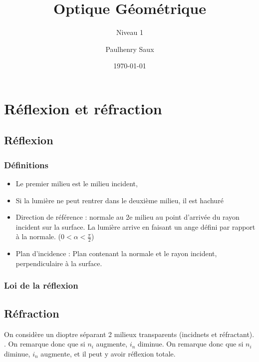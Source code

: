 \documentclass[french]{yLectureNote}
\title{Optique Géométrique}
\subtitle{Niveau 1}
\author{Paulhenry Saux}
\date{\today}
\begin{document}
\setcounter{chapter}{1}
	\chapter{Réflexion et réfraction}
	\section{Réflexion}
	\subsection{Définitions}
	\begin{itemize}
	 \item Le premier milieu est le milieu incident,
	 \item Si la lumière ne peut rentrer dans le deuxième milieu, il est hachuré
	 \item Direction de référence : normale au 2e milieu au point d'arrivée du rayon incident sur la surface. La lumière arrive en faisant un ange défini par rapport à la normale. ($0<\alpha<\frac{\pi}{2}$)
	 \item Plan d'incidence : Plan contenant la normale et le rayon incident, perpendiculaire à la surface.
	\end{itemize}
	\subsection{Loi de la réflexion}


	\section{Réfraction}
	On considère un dioptre séparant 2 milieux transparents (incidnets et réfractant). .
On remarque donc que si $n_i$ augmente, $i_n$ diminue.
On remarque donc que si $n_i$ diminue, $i_n$ augmente, et il peut y avoir réflexion totale.
\end{document}
